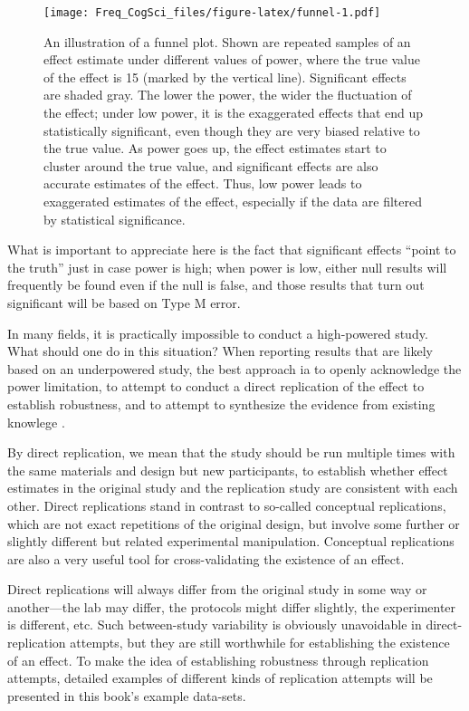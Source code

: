 \documentclass[12pt,]{krantz}
\begin{document}
\begin{figure}
\centering
\texttt{[image: Freq\_CogSci\_files/figure-latex/funnel-1.pdf]}
\caption{\label{fig:funnel}An illustration of a funnel plot. Shown are repeated samples of an effect estimate under different values of power, where the true value of the effect is 15 (marked by the vertical line). Significant effects are shaded gray. The lower the power, the wider the fluctuation of the effect; under low power, it is the exaggerated effects that end up statistically significant, even though they are very biased relative to the true value. As power goes up, the effect estimates start to cluster around the true value, and significant effects are also accurate estimates of the effect. Thus, low power leads to exaggerated estimates of the effect, especially if the data are filtered by statistical significance.}
\end{figure}

What is important to appreciate here is the fact that significant effects ``point to the truth'' just in case power is high; when power is low, either null results will frequently be found even if the null is false, and those results that turn out significant will be based on Type M error.

In many fields, it is practically impossible to conduct a high-powered study. What should one do in this situation? When reporting results that are likely based on an underpowered study, the best approach ia to openly acknowledge the power limitation, to attempt to conduct a direct replication of the effect to establish robustness, and to attempt to synthesize the evidence from existing knowlege \citep{cumming2014new}.

By direct replication, we mean that the study should be run multiple times with the same materials and design but new participants, to establish whether effect estimates in the original study and the replication study are consistent with each other. Direct replications stand in contrast to so-called conceptual replications, which are not exact repetitions of the original design, but involve some further or slightly different but related experimental manipulation. Conceptual replications are also a very useful tool for cross-validating the existence of an effect.

Direct replications will always differ from the original study in some way or another---the lab may differ, the protocols might differ slightly, the experimenter is different, etc. Such between-study variability is obviously unavoidable in direct-replication attempts, but they are still worthwhile for establishing the existence of an effect. To make the idea of establishing robustness through replication attempts, detailed examples of different kinds of replication attempts will be presented in this book's example data-sets.
\end{document}
